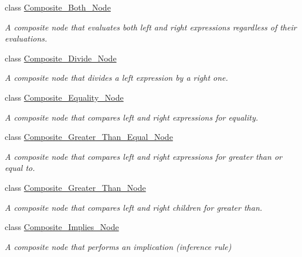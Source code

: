 \begin{DoxyCompactItemize}
class \hyperlink{classMadara_1_1Expression__Tree_1_1Composite__Both__Node}{Composite\_\-Both\_\-Node}
\begin{DoxyCompactList}\small\item\em A composite node that evaluates both left and right expressions regardless of their evaluations. \item\end{DoxyCompactList}\item 
class \hyperlink{classMadara_1_1Expression__Tree_1_1Composite__Divide__Node}{Composite\_\-Divide\_\-Node}
\begin{DoxyCompactList}\small\item\em A composite node that divides a left expression by a right one. \item\end{DoxyCompactList}\item 
class \hyperlink{classMadara_1_1Expression__Tree_1_1Composite__Equality__Node}{Composite\_\-Equality\_\-Node}
\begin{DoxyCompactList}\small\item\em A composite node that compares left and right expressions for equality. \item\end{DoxyCompactList}\item 
class \hyperlink{classMadara_1_1Expression__Tree_1_1Composite__Greater__Than__Equal__Node}{Composite\_\-Greater\_\-Than\_\-Equal\_\-Node}
\begin{DoxyCompactList}\small\item\em A composite node that compares left and right expressions for greater than or equal to. \item\end{DoxyCompactList}\item 
class \hyperlink{classMadara_1_1Expression__Tree_1_1Composite__Greater__Than__Node}{Composite\_\-Greater\_\-Than\_\-Node}
\begin{DoxyCompactList}\small\item\em A composite node that compares left and right children for greater than. \item\end{DoxyCompactList}\item 
class \hyperlink{classMadara_1_1Expression__Tree_1_1Composite__Implies__Node}{Composite\_\-Implies\_\-Node}
\begin{DoxyCompactList}\small\item\em A composite node that performs an implication (inference rule) \item\end{DoxyCompactList}\item 

\end{DoxyCompactItemize}
